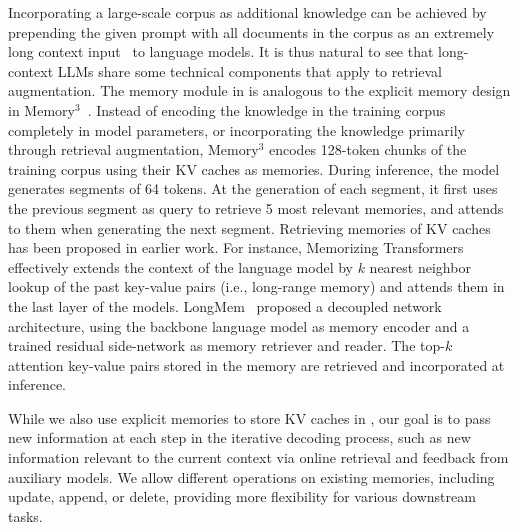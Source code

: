 Incorporating a large-scale corpus as additional knowledge can be achieved by prepending the given prompt with all documents in the corpus as an extremely long context input~\citep{lee2024longcontextlanguagemodelssubsume} to language models. It is thus natural to see that long-context LLMs share some technical components that apply to retrieval augmentation.
The memory module in \model is analogous to the explicit memory design in Memory$^3$~\citep{yang2024text}.
Instead of encoding the knowledge in the training corpus completely in model parameters, or incorporating the knowledge primarily through retrieval augmentation, Memory$^3$ encodes 128-token chunks of the training corpus using their KV caches as memories. 
During inference, the model generates segments of 64 tokens. At the generation of each segment, it first uses the previous segment as query to retrieve 5 most relevant memories, and attends to them when generating the next segment.
Retrieving memories of KV caches has been proposed in earlier work. For instance, Memorizing Transformers~\citep{wu2022memorizing} effectively extends the context of the language model by $k$ nearest neighbor lookup of the past key-value pairs (i.e., long-range memory) and attends them in the last layer of the models. 
LongMem~\citep{Wang-augmenting-2023} proposed a decoupled network architecture, using the backbone language model as memory encoder and a trained residual side-network as memory retriever and reader. The top-$k$ attention key-value pairs stored in the memory are retrieved and incorporated at inference.

While we also use explicit memories to store KV caches in \model, our goal is to pass new information at each step in the iterative decoding process, such as new information relevant to the current context via online retrieval and feedback from auxiliary models. We allow different operations on existing memories, including update, append, or delete, providing more flexibility for various downstream tasks.